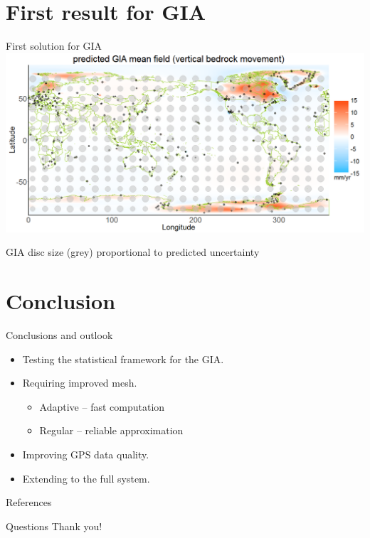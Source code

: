 \documentclass{beamer}
\begin{document}
\section{First result for GIA}
\begin{frame}{First solution for GIA}
\vspace{0.5cm}
\includegraphics[width = 1.05\textwidth]{images/GIA_map}

\centering
\footnotesize{GIA disc size (grey) proportional to predicted uncertainty}
\end{frame}

\section{Conclusion}
\begin{frame}{Conclusions and outlook}

\begin{itemize}
\item Testing the statistical framework for the GIA.
\item Requiring improved mesh.
\begin{itemize}
\item Adaptive -- fast computation
\item Regular -- reliable approximation
\end{itemize}
\item Improving GPS data quality.
\item Extending to the full system.
\end{itemize}


\end{frame}

\begin{frame}{References}

\small{}
\end{frame}


\begin{frame}{Questions}
\centering
\Huge
Thank you!
\end{frame}
\end{document}
